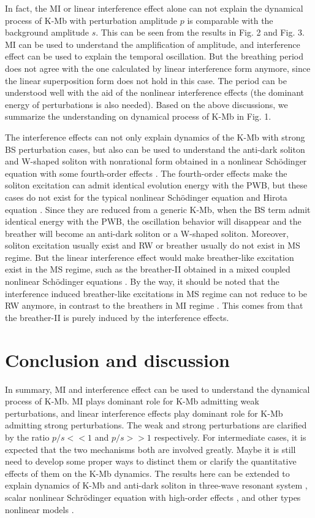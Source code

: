 \documentclass[aps,twocolumn,showpacs]{revtex4}
\begin{document}
In fact, the MI or linear interference effect alone can not explain the dynamical process of K-Mb with perturbation amplitude $p$ is comparable with the background amplitude $s$. This can be seen from the results in Fig. 2 and Fig. 3. MI can be used to understand the amplification of amplitude, and interference effect can be used to explain the temporal  oscillation. But the breathing period does not agree with the one calculated by linear interference form anymore, since the linear superposition form does not hold  in this case. The period can be understood well with the aid of the nonlinear interference effects (the dominant energy of perturbations is also needed).   Based on the above discussions, we summarize the understanding  on dynamical process of K-Mb in Fig. 1.


The interference effects can not only explain dynamics of the K-Mb with strong BS perturbation cases, but also can be used to understand the anti-dark soliton and W-shaped soliton with nonrational form obtained in a  nonlinear Sch\"{o}dinger equation with some fourth-order effects \cite{AD}. The fourth-order effects make the soliton excitation can admit identical evolution energy with the PWB, but these cases do not exist for the typical nonlinear Sch\"{o}dinger equation and Hirota equation \cite{zhaoling,Liu1}.   Since they are reduced from a generic K-Mb, when the BS term admit identical energy with the PWB, the oscillation behavior will disappear and the breather will become an anti-dark soliton or a W-shaped soliton. Moreover, soliton excitation usually exist and RW or breather usually do not exist in MS regime. But the linear interference effect would make breather-like excitation exist in the MS regime, such as the breather-II obtained in a mixed coupled nonlinear Sch\"{o}dinger equations  \cite{defnls}. By the way, it should be noted that the interference induced breather-like excitations in MS regime can not reduce to be RW anymore, in contrast to the breathers in MI regime \cite{Kibler,Dudley,Kibler2}. This comes from that the breather-II is purely induced by the interference effects.



\section{Conclusion and discussion}
In summary,  MI and interference effect can be used to understand the dynamical process of K-Mb. MI plays dominant role for K-Mb admitting weak perturbations, and linear interference effects play dominant role for K-Mb admitting  strong perturbations. The weak and strong perturbations are clarified by the ratio $p/s<< 1$ and $p/s>>1$ respectively. For   intermediate cases, it is expected that the two mechanisms both are involved greatly. Maybe it is still need to develop some proper ways to distinct them or clarify the quantitative effects of them on the K-Mb dynamics.  The results here can be extended to explain dynamics of K-Mb and anti-dark soliton in three-wave resonant system \cite{threew}, scalar  nonlinear Schr\"{o}dinger
equation with high-order effects \cite{Hirota,SS,Wen2}, and other types nonlinear models \cite{coupledsh,1,2,6}.
\end{document}
